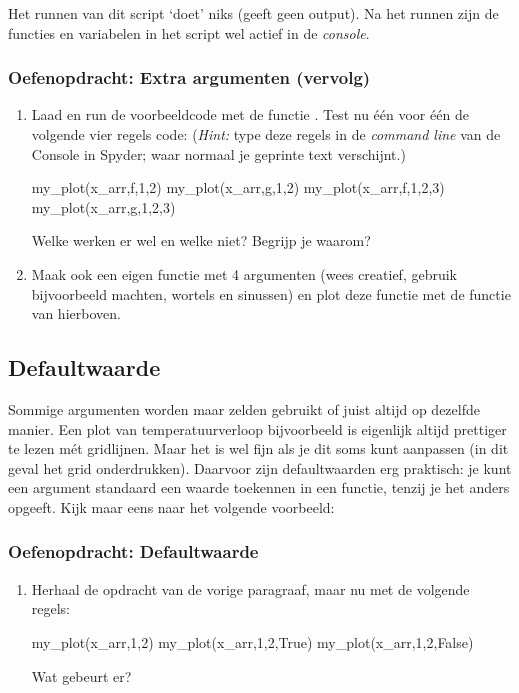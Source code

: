 \documentclass[a4paper,11pt, fleqn]{article}
\begin{document}

Het runnen van dit script `doet' niks (geeft geen output). Na het runnen zijn de functies en variabelen in het script wel actief in de \textit{console}.

\subsubsection*{Oefenopdracht: Extra argumenten (vervolg)}
\begin{enumerate}[label=(\alph*), resume]
\item Laad en run de voorbeeldcode met de functie . Test nu \'e\'en voor \'e\'en de volgende vier regels code: (\textit{Hint:} type deze regels in de \textit{command line} van de Console in Spyder; waar normaal je geprinte text verschijnt.)
\begin{python}
my_plot(x_arr,f,1,2)
my_plot(x_arr,g,1,2)
my_plot(x_arr,f,1,2,3)
my_plot(x_arr,g,1,2,3)
\end{python}
Welke werken er wel en welke niet? Begrijp je waarom?
\item Maak ook een eigen functie met 4 argumenten (wees creatief, gebruik bijvoorbeeld machten, wortels en sinussen) en plot deze functie met de  functie van hierboven.
\end{enumerate}

\subsection{Defaultwaarde}
Sommige argumenten worden maar zelden gebruikt of juist altijd op dezelfde manier. Een plot van temperatuurverloop bijvoorbeeld is eigenlijk altijd prettiger te lezen m\'et gridlijnen. Maar het is wel fijn als je dit soms kunt aanpassen (in dit geval het grid onderdrukken). Daarvoor zijn defaultwaarden erg praktisch: je kunt een argument standaard een waarde toekennen in een functie, tenzij je het anders opgeeft. Kijk maar eens naar het volgende voorbeeld:


\subsubsection*{Oefenopdracht: Defaultwaarde}
\begin{enumerate}
	\item Herhaal de opdracht van de vorige paragraaf, maar nu met de volgende regels:
	\begin{python}
my_plot(x_arr,1,2)
my_plot(x_arr,1,2,True)
my_plot(x_arr,1,2,False)
	\end{python}
	Wat gebeurt er?
\end{enumerate}
\end{document}
